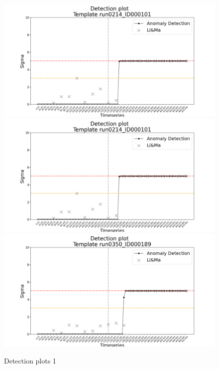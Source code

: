 \begin{figure}
    
    \includegraphics[width=1\textwidth]{figures/experiments/detection_plots/detection_plot_run0214_ID000101_testset_e.png}\hfill
    \\[\smallskipamount]
    
    \includegraphics[width=1\textwidth]{figures/experiments/detection_plots/detection_plot_run0214_ID000101_testset_e.png}\hfill
    \\[\smallskipamount]

    \includegraphics[width=1\textwidth]{figures/experiments/detection_plots/detection_plot_run0350_ID000189_testset_e.png}\hfill
    \\[\smallskipamount]

    \caption{Detection plots 1}\label{fig:detection-plots-1}
\end{figure}


